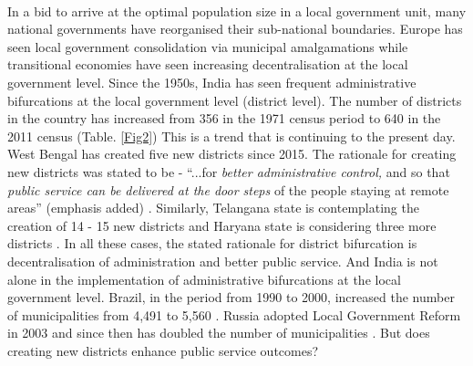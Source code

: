 \documentclass[12pt, a4paper]{article}
\begin{document}
\paragraph{} In a bid to arrive at the optimal population size in a local government unit, many national governments have reorganised their sub-national boundaries. Europe has seen local government consolidation via municipal amalgamations while transitional economies have seen increasing decentralisation at the local government level. Since the 1950s, India has seen frequent administrative bifurcations at the local government level (district level). The number of districts in the country has increased from 356 in the 1971 census period to 640 in the 2011 census (Table. \ref{Fig2}) This is a trend that is continuing to the present day. West Bengal has created five new districts since 2015. The rationale for creating new districts was stated to be - ``...for \textit{better administrative control,} and so that \textit{public service can be delivered at the door steps} of the people staying at remote areas'' (emphasis added) \parencite{Mamata}. Similarly, Telangana state is contemplating the creation of 14 - 15 new districts \parencite{Telengana} and Haryana state is considering three more districts \parencite{Haryana}. In all these cases, the stated rationale for district bifurcation is decentralisation of administration and better public service. And India is not alone in the implementation of administrative bifurcations at the local government level. Brazil, in the period from 1990 to 2000, increased the number of municipalities from 4,491 to 5,560 \parencite{tomio2005creation}. Russia adopted Local Government Reform in 2003 and since then has doubled the number of municipalities \parencite{turgel2008new}\nocite{avellaneda_is_2015}. But does creating new districts enhance public service outcomes?
	
\end{document}
